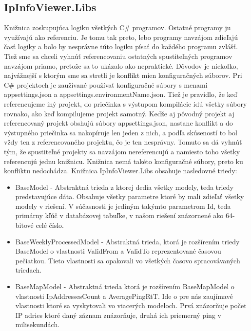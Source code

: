 \subsection{IpInfoViewer.Libs}
Knižnica zoskupujúca logiku všetkých C\# programov. Ostatné programy ju využívajú ako referenciu. Je tomu tak preto, lebo programy navzájom zdieľajú 
časť logiky a bolo by nesprávne túto logiku písať do každého programu zvlášť. Tiež sme sa chceli vyhnúť referencovaniu ostatných spustiteľných programov navzájom 
priamo, pretože sa to ukázalo ako nepraktické. Dôvodov je niekoľko, najvážnejší s ktorým sme sa stretli je konflikt mien konfiguračných súborov. Pri C\# 
projektoch je zaužívané používať konfiguračné súbory s menami appsettings.json a appsettings.{environmentName}.json. Tiež je pravidlo, že keď referencujeme 
iný projekt, do priečinka s výstupom kompilácie idú všetky súbory rovnako, ako keď kompilujeme projekt samotný. Keďže aj pôvodný projekt aj referencovaný projekt 
obshujú súbory appsettings.json, nastane konflikt a do výstupného priečinka sa nakopíruje len jeden z nich, a podľa skúseností to bol vždy ten z referencovaného projektu, 
čo je ten nesprávny. Tomuto sa dá vyhnúť tým, že spustiteľné projekty sa navzájom nereferencujú a namiesto toho všetky referencujú jednu knižnicu. Knižnica nemá takéto 
konfiguračné súbory, preto ku konfliktu nedochádza. Knižnica IpInfoViewer.Libs obsahuje nasledovné triedy: 
\begin{itemize}
    \item BaseModel
    - Abstraktná trieda z ktorej dedia všetky modely, teda triedy predstavujúce dáta. Obsahuje všetky parametre ktoré by mali zdieľať všetky modely v riešení. V súčasnosti 
    je jediným takýmto parametrom Id, teda primárny kľúč v databázovej tabuľke, v našom riešení znázornené ako 64-bitové celé číslo.
    \item BaseWeeklyProcessedModel
    - Abstraktná trieda, ktorá je rozšírením triedy BaseModel o vlastnosti ValidFrom a ValidTo reprezentované časovou pečiatkou. Tieto vlastnosti 
    sa opakovali vo všetkých časovo spracovávaných triedach.
    \item BaseMapModel 
    - Abstraktná trieda ktorá je rozšírením BaseMapModel o vlastnosti IpAddressesCount a AveragePingRtT. Ide o pre nás zaujímavé vlastnosti ktoré sa vyskytovali vo 
    viacerých modeloch. Prvá znázorňuje počet IP adries ktoré daný záznam znázorňuje, druhá ich priemerný ping v milisekundách.
\end{itemize}
